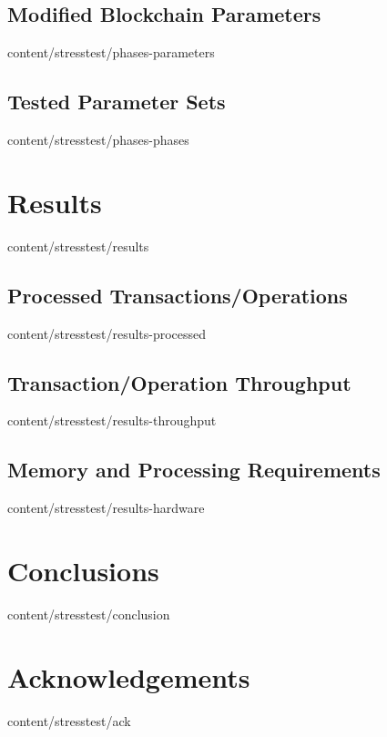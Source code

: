 \documentclass{btswhitepaper}
\begin{document}
\subsection { Modified Blockchain Parameters     }  { content/stresstest/phases-parameters  } 
\subsection { Tested Parameter Sets              }  { content/stresstest/phases-phases      } 
\section    { Results                            }  { content/stresstest/results            } 
\subsection { Processed Transactions/Operations  }  { content/stresstest/results-processed  } 
\subsection { Transaction/Operation Throughput   }  { content/stresstest/results-throughput } 
\subsection { Memory and Processing Requirements }  { content/stresstest/results-hardware   } 
\section    { Conclusions                        }  { content/stresstest/conclusion         } 
\section    { Acknowledgements                   }  { content/stresstest/ack                } 



\end{document}
